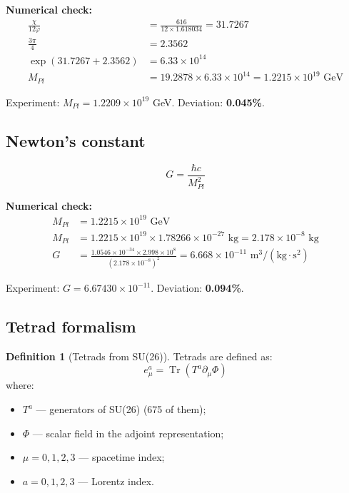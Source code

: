 \documentclass[12pt,a4paper,twoside]{article}
\DeclareMathOperator{\Tr}{Tr}
\theoremstyle{definition}
\newtheorem{definition}{Definition}[section]
\begin{document}
\textbf{Numerical check:}
\begin{align}
\frac{\chi}{12\varphi} &= \frac{616}{12 \times 1.618034} = 31.7267 \\
\frac{3\pi}{4} &= 2.3562 \\
\exp(31.7267 + 2.3562) &= 6.33 \times 10^{14} \\
M_{Pl} &= 19.2878 \times 6.33 \times 10^{14} = 1.2215 \times 10^{19} \text{ GeV}
\end{align}

Experiment: $M_{Pl} = 1.2209 \times 10^{19}$ GeV. Deviation: \textbf{0.045\%}.

\subsection{Newton's constant}

\begin{equation}
G = \frac{\hbar c}{M_{Pl}^2}
\label{eq:newton}
\end{equation}

\textbf{Numerical check:}
\begin{align}
M_{Pl} &= 1.2215 \times 10^{19} \text{ GeV} \\
M_{Pl} &= 1.2215 \times 10^{19} \times 1.78266 \times 10^{-27} \text{ kg} = 2.178 \times 10^{-8} \text{ kg} \\
G &= \frac{1.0546 \times 10^{-34} \times 2.998 \times 10^8}{(2.178 \times 10^{-8})^2} = 6.668 \times 10^{-11} \text{ m}^3/(\text{kg}\cdot\text{s}^2)
\end{align}

Experiment: $G = 6.67430 \times 10^{-11}$. Deviation: \textbf{0.094\%}.

\subsection{Tetrad formalism}

\begin{definition}[Tetrads from SU(26)]
Tetrads are defined as:
\begin{equation}
e_\mu^a = \Tr(T^a \partial_\mu \Phi)
\end{equation}
where:
\begin{itemize}
    \item $T^a$ — generators of SU(26) (675 of them);
    \item $\Phi$ — scalar field in the adjoint representation;
    \item $\mu = 0,1,2,3$ — spacetime index;
    \item $a = 0,1,2,3$ — Lorentz index.
\end{itemize}
\end{definition}
\end{document}
